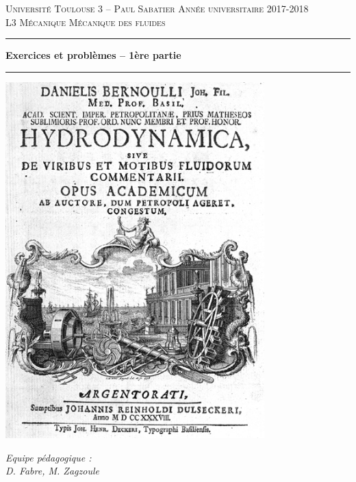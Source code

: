 \documentclass[10pt, a4paper]{article}
\begin{document}
                                          

\begin{titlepage}

\noindent
\textsc{Universit\'e Toulouse 3 -- Paul Sabatier \hfill Ann\'ee universitaire 2017-2018}
\\
\textsc{L3 M\'ecanique \hfill M\'ecanique des fluides}

\vspace{1cm}

\begin{center}
  \setlength{\unitlength}{1mm}
  \hrule height 1mm
  \vspace{6mm}
  \textbf{\LARGE Exercices et probl\`emes -- 1ère partie}
  \\ \vspace{5mm}
  \hrule height 1mm
  \vspace{2cm}
  \includegraphics[width=10cm]{bernoulli}
\end{center}

\vfill

\begin{flushright}
  \large{\textsl{Equipe p\'edagogique : \\
      D. Fabre, M. Zagzoule}}
\end{flushright}

\end{titlepage}

\tableofcontents








\appendix

\end{document}
